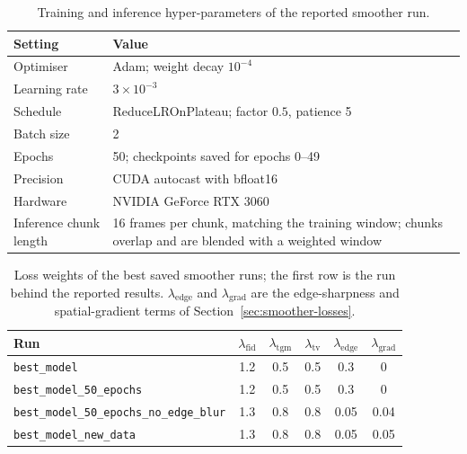 \begin{table}[H]
    \caption{Training and inference hyper-parameters of the reported smoother run.}
    \label{tab:app-hyperparameters}
    \begin{center}
        \begin{tabular}{@{}p{3.6cm}p{10.4cm}@{}}
            \toprule
            Setting & Value \\
            \midrule
            Optimiser & Adam; weight decay $10^{-4}$ \\
            Learning rate & $3\times10^{-3}$ \\
            Schedule & ReduceLROnPlateau; factor $0.5$, patience 5 \\
            Batch size & 2 \\
            Epochs & 50; checkpoints saved for epochs 0--49 \\
            Precision & CUDA autocast with bfloat16 \\
            Hardware & NVIDIA GeForce RTX 3060 \\
            Inference chunk length & 16 frames per chunk, matching the training window; chunks
            overlap and are blended with a weighted window \\
            \bottomrule
        \end{tabular}
    \end{center}
\end{table}

\begin{table}[H]
    \caption{Loss weights of the best saved smoother runs; the first row is the run behind the
    reported results. $\lambda_{\mathrm{edge}}$ and $\lambda_{\mathrm{grad}}$ are the
    edge-sharpness and spatial-gradient terms of Section~\ref{sec:smoother-losses}.}
    \label{tab:app-lossweights}
    \begin{center}
        \small
        \begin{tabular}{@{}p{5.6cm}ccccc@{}}
            \toprule
            Run & $\lambda_{\mathrm{fid}}$ & $\lambda_{\mathrm{tgm}}$ & $\lambda_{\mathrm{tv}}$
            & $\lambda_{\mathrm{edge}}$ & $\lambda_{\mathrm{grad}}$ \\
            \midrule
                        \texttt{best\_model} & 1.2 & 0.5 & 0.5 & 0.3 & 0 \\
            \texttt{best\_model\_50\_epochs} & 1.2 & 0.5 & 0.5 & 0.3 & 0 \\
            \texttt{best\_model\_50\_epochs\_no\_edge\_blur} & 1.3 & 0.8 & 0.8 & 0.05 & 0.04 \\
            \texttt{best\_model\_new\_data} & 1.3 & 0.8 & 0.8 & 0.05 & 0.05 \\
            \bottomrule
        \end{tabular}
    \end{center}
\end{table}

